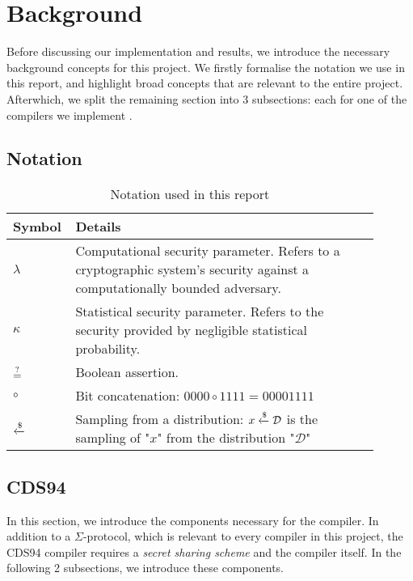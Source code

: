 \section{Background}
\label{sec:background}
Before discussing our implementation and results, we introduce the necessary background concepts for this project. 
We firstly formalise the notation we use in this report, and highlight broad concepts that are relevant to the entire project. 
Afterwhich, we split the remaining section into 3 subsections: 
each for one of the compilers we implement \cite{CDS94, StackingSigmas, SpeedStacking}.

\subsection{Notation}\label{sec:notation}
\begin{table}[h]
  \centering
  \label{tab:notation}
  \caption{Notation used in this report}
  \begin{tabular}{|A{0.1\linewidth}|M{0.8\linewidth}|}
    \hline
    Symbol & Details \\\hline
    $\lambda$ & Computational security parameter. Refers to a cryptographic system's security 
    against a computationally bounded adversary. \\\hline
    $\kappa$ & Statistical security parameter. Refers to the security provided by negligible statistical probability. \\\hline
    $\overset {?} {=}$ & Boolean assertion. \\\hline
    $\circ$ & Bit concatenation: $0000 \circ 1111 = 00001111$ \\\hline
    $\xleftarrow{\$}$ & Sampling from a distribution: $x \xleftarrow{\$} \mathcal D$ is the sampling of "$x$" from 
    the distribution "$\mathcal D$" \\
    \hline
  \end{tabular}
\end{table}







\subsection{CDS94}
In this section, we introduce the components necessary for the \cite{CDS94} compiler. In addition to a $\Sigma$-protocol, which 
is relevant to every compiler in this project, the CDS94 compiler requires a \emph{secret sharing scheme} and the compiler 
itself. In the following 2 subsections, we introduce these components.



